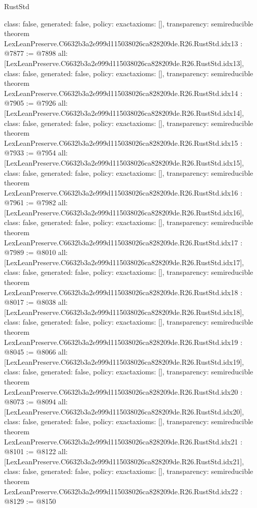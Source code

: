 \begin{lexlean}{RustStd}
\begin{coremodule}
{  class: false,
  generated: false,
  policy: exact{axioms: []},
  transparency: semireducible
}
theorem LexLeanPreserve.C6632b3a2e999d115038026ca828209de.R26.RustStd.idx13 : @7877 := @7898 {
  all: [LexLeanPreserve.C6632b3a2e999d115038026ca828209de.R26.RustStd.idx13],
  class: false,
  generated: false,
  policy: exact{axioms: []},
  transparency: semireducible
}
theorem LexLeanPreserve.C6632b3a2e999d115038026ca828209de.R26.RustStd.idx14 : @7905 := @7926 {
  all: [LexLeanPreserve.C6632b3a2e999d115038026ca828209de.R26.RustStd.idx14],
  class: false,
  generated: false,
  policy: exact{axioms: []},
  transparency: semireducible
}
theorem LexLeanPreserve.C6632b3a2e999d115038026ca828209de.R26.RustStd.idx15 : @7933 := @7954 {
  all: [LexLeanPreserve.C6632b3a2e999d115038026ca828209de.R26.RustStd.idx15],
  class: false,
  generated: false,
  policy: exact{axioms: []},
  transparency: semireducible
}
theorem LexLeanPreserve.C6632b3a2e999d115038026ca828209de.R26.RustStd.idx16 : @7961 := @7982 {
  all: [LexLeanPreserve.C6632b3a2e999d115038026ca828209de.R26.RustStd.idx16],
  class: false,
  generated: false,
  policy: exact{axioms: []},
  transparency: semireducible
}
theorem LexLeanPreserve.C6632b3a2e999d115038026ca828209de.R26.RustStd.idx17 : @7989 := @8010 {
  all: [LexLeanPreserve.C6632b3a2e999d115038026ca828209de.R26.RustStd.idx17],
  class: false,
  generated: false,
  policy: exact{axioms: []},
  transparency: semireducible
}
theorem LexLeanPreserve.C6632b3a2e999d115038026ca828209de.R26.RustStd.idx18 : @8017 := @8038 {
  all: [LexLeanPreserve.C6632b3a2e999d115038026ca828209de.R26.RustStd.idx18],
  class: false,
  generated: false,
  policy: exact{axioms: []},
  transparency: semireducible
}
theorem LexLeanPreserve.C6632b3a2e999d115038026ca828209de.R26.RustStd.idx19 : @8045 := @8066 {
  all: [LexLeanPreserve.C6632b3a2e999d115038026ca828209de.R26.RustStd.idx19],
  class: false,
  generated: false,
  policy: exact{axioms: []},
  transparency: semireducible
}
theorem LexLeanPreserve.C6632b3a2e999d115038026ca828209de.R26.RustStd.idx20 : @8073 := @8094 {
  all: [LexLeanPreserve.C6632b3a2e999d115038026ca828209de.R26.RustStd.idx20],
  class: false,
  generated: false,
  policy: exact{axioms: []},
  transparency: semireducible
}
theorem LexLeanPreserve.C6632b3a2e999d115038026ca828209de.R26.RustStd.idx21 : @8101 := @8122 {
  all: [LexLeanPreserve.C6632b3a2e999d115038026ca828209de.R26.RustStd.idx21],
  class: false,
  generated: false,
  policy: exact{axioms: []},
  transparency: semireducible
}
theorem LexLeanPreserve.C6632b3a2e999d115038026ca828209de.R26.RustStd.idx22 : @8129 := @8150 {
}
\end{coremodule}
\end{lexlean}
